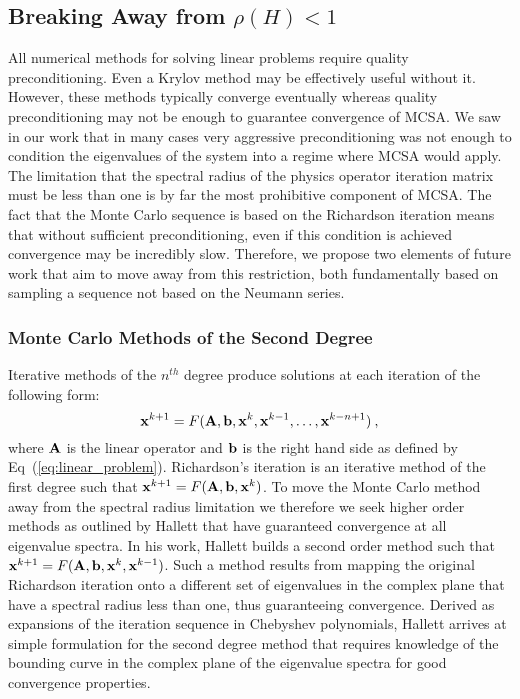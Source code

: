 \subsection{Breaking Away from $\rho(H) < 1$}
\label{subsec:future_spec_rad}

All numerical methods for solving linear problems require quality
preconditioning. Even a Krylov method may be effectively useful
without it. However, these methods typically converge eventually
whereas quality preconditioning may not be enough to guarantee
convergence of MCSA. We saw in our work that in many cases very
aggressive preconditioning was not enough to condition the eigenvalues
of the system into a regime where MCSA would apply. The limitation
that the spectral radius of the physics operator iteration matrix must
be less than one is by far the most prohibitive component of MCSA. The
fact that the Monte Carlo sequence is based on the Richardson
iteration means that without sufficient preconditioning, even if this
condition is achieved convergence may be incredibly slow. Therefore,
we propose two elements of future work that aim to move away from this
restriction, both fundamentally based on sampling a sequence not based
on the Neumann series.

\subsubsection{Monte Carlo Methods of the Second Degree}
\label{subsubsec:2_degree_mc}

Iterative methods of the $n^{th}$ degree produce solutions at each
iteration of the following form:
\begin{equation}
  \mathbf{x}^{k+1} = F(\mathbf{A},\mathbf{b},\mathbf{x}^{k},\mathbf{x}^{k-1},\dots,\mathbf{x}^{k-n+1})\:,
\label{eq:nth_degree_iter}
\end{equation}
where $\mathbf{A}$ is the linear operator and $\mathbf{b}$ is the right hand
side as defined by Eq~(\ref{eq:linear_problem}). Richardson's
iteration is an iterative method of the first degree such that
$\mathbf{x}^{k+1} = F(\mathbf{A},\mathbf{b},\mathbf{x}^{k})$. To move the Monte Carlo
method away from the spectral radius limitation we therefore we seek
higher order methods as outlined by Hallett
\cite{hughes_hallett_second-order_1984} that have guaranteed
convergence at all eigenvalue spectra. In his work, Hallett builds a
second order method such that $\mathbf{x}^{k+1} =
F(\mathbf{A},\mathbf{b},\mathbf{x}^{k},\mathbf{x}^{k-1})$. Such a method results from
mapping the original Richardson iteration onto a different set of
eigenvalues in the complex plane that have a spectral radius less than
one, thus guaranteeing convergence. Derived as expansions of the
iteration sequence in Chebyshev polynomials, Hallett arrives at simple
formulation for the second degree method that requires knowledge of
the bounding curve in the complex plane of the eigenvalue spectra for
good convergence properties.

